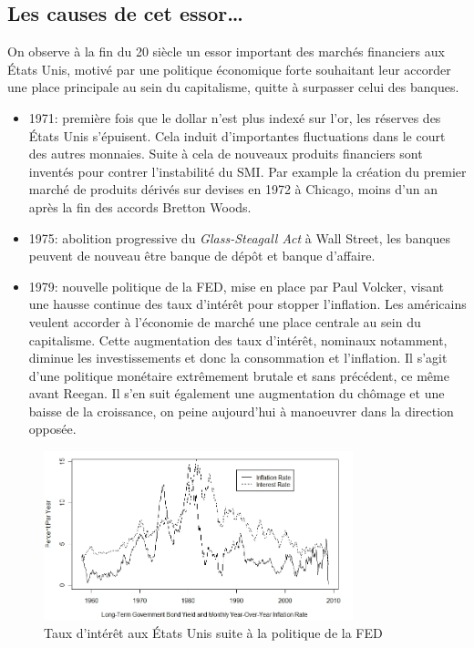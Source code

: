 \documentclass[main.tex]{subfiles}
\begin{document}
\subsection{Les causes de cet essor\ldots}

On observe à la fin du 20 siècle un essor important des marchés financiers aux États Unis, motivé par une politique économique forte souhaitant leur accorder une place principale au sein du capitalisme, quitte à surpasser celui des banques.
\begin{itemize}
        \item 1971: première fois que le dollar n'est plus indexé sur l'or, les réserves des États Unis s'épuisent. Cela induit d'importantes fluctuations dans le court des autres monnaies. Suite à cela de nouveaux produits financiers sont inventés pour contrer l'instabilité du SMI. Par example la création du premier marché de produits dérivés sur devises en 1972 à Chicago, moins d'un an après la fin des accords Bretton Woods.
        \item 1975: abolition progressive du \emph{Glass-Steagall Act} à Wall Street, les banques peuvent de nouveau être banque de dépôt et banque d'affaire. 
        \item 1979: nouvelle politique de la FED, mise en place par Paul Volcker, visant une hausse continue des taux d'intérêt pour stopper l'inflation. Les américains veulent accorder à l'économie de marché une place centrale au sein du capitalisme. Cette augmentation des taux d'intérêt, nominaux notamment, diminue les investissements et donc la consommation et l'inflation. Il s'agit d'une politique monétaire extrêmement brutale et sans précédent, ce même avant Reegan. Il s'en suit également une augmentation du chômage et une baisse de la croissance, on peine aujourd'hui  à manoeuvrer dans la direction opposée.
\end{itemize}

\begin{figure}[htpb]
        \centering
        \includegraphics[width=0.8\textwidth]{interest_rates.jpg}
        \caption{Taux d'intérêt aux États Unis suite à la politique de la FED}
        \label{fig:interest_rates-jpg}
\end{figure}
\end{document}
